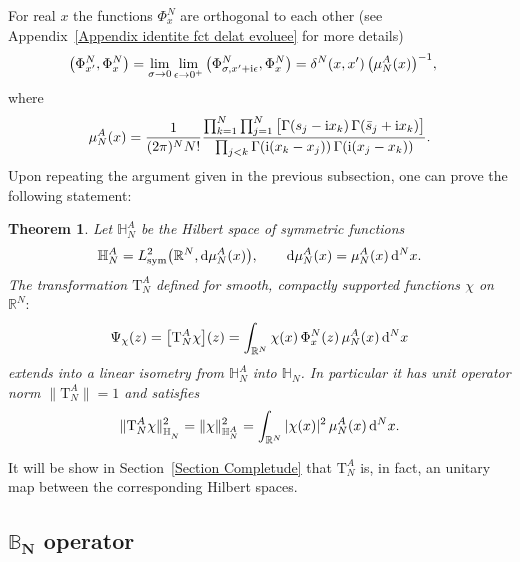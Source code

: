 \documentclass[pdftex]{sigma}%
\numberwithin{equation}{section}
\newtheorem{Theorem}{Theorem}[section]
\begin{document}
 For real $x$ the functions $\Phi^N_{ x}$ are orthogonal to
each other (see Appendix~\ref{Appendix identite fct delat evoluee} for more details)
\begin{align}\label{PhiAort}
 \big(\Phi^N_{ x'}, \Phi^N_{ x}\big) &=\lim_{\sigma\to0}\lim_{\epsilon\to 0^+}\big(\Phi^N_{\sigma, x'+{\rm i}\epsilon}, \Phi^N_x\big)
 =\delta^N( x,x')\, \big(\mu_N^A( x)\big)^{-1},
\end{align}
where
\begin{gather*}%
 \mu_N^A( x) = \frac1{(2\pi)^N N!}
 \frac{\prod_{k=1}^{N}\prod_{j=1}^N\big[\Gamma( s_j-{\rm i}x_k)\,\Gamma(\bar s_j+{\rm i}x_k)\big]}
 {\prod_{j< k} \Gamma({\rm i}(x_k-x_j))\,\Gamma({\rm i}(x_j-x_k))}.
\end{gather*}
Upon repeating the argument given in the previous subsection, one can prove the following statement:

\begin{Theorem}
Let $\mathbb H_N^A$ be the Hilbert space of symmetric functions
\begin{gather*}
\mathbb H_N^A =L^2_{\rm sym}\big(\mathbb R^N, {\rm d}\mu^A_N(x)\big),\qquad
{\rm d}\mu^A_N(x)=\mu^A_N(x)\, {\rm d}^Nx.
\end{gather*}
The transformation $\mathrm T_N^{A}$ defined for smooth, compactly supported functions $\chi$ on $\mathbb{R}^N{:}$
\begin{gather}\label{A-map}
\Psi_{\chi}(z)=\big[\mathrm T_N^A\chi\big](z)
=\int_{\mathbb R^{N}} \chi(x)\, \Phi^N_{{x}}( z)\, \mu_{N}^{A}( x)\, {\rm d}^{N} x
\end{gather}
extends into a linear isometry from $\mathbb H_N^A$ into $\mathbb H_N$. In particular it has unit operator norm $\big\|\mathrm T_{N}^{A}\big\|=1$
and satisfies
\begin{gather*}
\|\mathrm T_N^A\chi\|^2_{\mathbb H_N^{\phantom{A}}} = \| \chi\|^2_{\mathbb H_N^{A}} = \int_{\mathbb R^{N}} |\chi( x)|^2\, \mu_{N}^{A}( x)\, {\rm d}^{N} x.
\end{gather*}
\end{Theorem}

It will be show in Section~\ref{Section Completude} that $\mathrm T_N^A$ is, in fact, an unitary map between the corresponding Hilbert
spaces.

\subsection[BN operator]{$\boldsymbol{\mathbb B_N}$ operator}%
\end{document}
